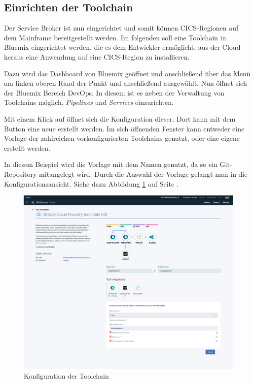 \subsection{Einrichten der Toolchain}
\label{subsec:einrichten_der_toolchain}
Der Service Broker ist nun eingerichtet und somit können CICS-Regionen auf dem Mainframe bereitgestellt werden. Im folgenden
soll eine Toolchain in Bluemix eingerichtet werden, die es dem Entwickler ermöglicht, aus der Cloud heraus eine Anwendung
auf eine CICS-Region zu installieren.

Dazu wird das Dashboard von Bluemix geöffnet und anschließend über das Menü am linken oberen Rand der Punkt 
und anschließend  ausgewählt. Nun öffnet sich der Bluemix Bereich DevOps. In diesem ist es neben der Verwaltung
von Toolchains möglich, \textit{Pipelines} und \textit{Services} einzurichten.

Mit einem Klick auf  öffnet sich die Konfiguration dieser. Dort kann mit dem Button
 eine neue erstellt werden. Im sich öffnenden Fenster kann entweder eine Vorlage der zahlreichen
vorkonfigurierten Toolchains genutzt, oder eine eigene erstellt werden.

In diesem Beispiel wird die Vorlage mit dem Namen  genutzt, da so ein
Git-Repository mitangelegt wird. Durch die Auswahl der Vorlage gelangt man in die Konfigurationsansicht. Siehe dazu
Abbildung \ref{fig:toolchain_konfiguration} auf Seite \pageref{fig:toolchain_konfiguration}.

\begin{figure}[h]
  \centering
    \includegraphics[scale=0.28]{images/kapitel_3/toolchain_konfiguration.pdf}
  \caption{Konfiguration der Toolchain}
  \label{fig:toolchain_konfiguration}
\end{figure}


